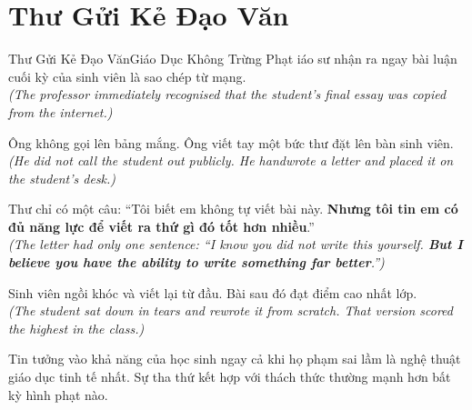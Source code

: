 \section{Thư Gửi Kẻ Đạo Văn}
\begin{truyen}{Thư Gửi Kẻ Đạo Văn}{Giáo Dục Không Trừng Phạt}
iáo sư nhận ra ngay bài luận cuối kỳ của sinh viên là sao chép từ mạng.\\
\textit{(The professor immediately recognised that the student's final essay was copied from the internet.)}

Ông không gọi lên bảng mắng. Ông viết tay một bức thư đặt lên bàn sinh viên.\\
\textit{(He did not call the student out publicly. He handwrote a letter and placed it on the student's desk.)}

Thư chỉ có một câu: ``Tôi biết em không tự viết bài này. \textbf{Nhưng tôi tin em có đủ năng lực để viết ra thứ gì đó tốt hơn nhiều}.''\\
\textit{(The letter had only one sentence: ``I know you did not write this yourself. \textbf{But I believe you have the ability to write something far better}.'')}

Sinh viên ngồi khóc và viết lại từ đầu. Bài sau đó đạt điểm cao nhất lớp.\\
\textit{(The student sat down in tears and rewrote it from scratch. That version scored the highest in the class.)}
\end{truyen}
\begin{baihoc}
  Tin tưởng vào khả năng của học sinh ngay cả khi họ phạm sai lầm là nghệ thuật giáo dục tinh tế nhất. Sự tha thứ kết hợp với thách thức thường mạnh hơn bất kỳ hình phạt nào.
\end{baihoc}

